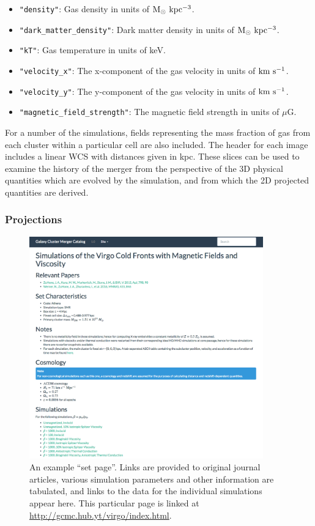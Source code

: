\documentclass{emulateapj}
\newcommand{\code}[1]{\texttt{#1}}
\begin{document}
\begin{itemize}
\item \code{"density"}: Gas density in units of $\rm{M_\odot~kpc^{-3}}$.
\item \code{"dark\_matter\_density"}: Dark matter density in units of $\rm{M_\odot~kpc^{-3}}$.
\item \code{"kT"}: Gas temperature in units of keV.
\item \code{"velocity\_x"}: The x-component of the gas velocity in units of $\rm{km~s^{-1}}$.
\item \code{"velocity\_y"}: The y-component of the gas velocity in units of $\rm{km~s^{-1}}$.
\item \code{"magnetic\_field\_strength"}: The magnetic field strength in units of $\mu$G.
\end{itemize}

For a number of the simulations, fields representing the mass fraction of gas from each cluster within a particular cell are also included. The header for each image includes a linear WCS with distances given in kpc. These slices can be used to examine the history of the merger from the perspective of the 3D physical quantities which are evolved by the simulation, and from which the 2D projected quantities are derived.

\subsubsection{Projections}\label{sec:projections}

\begin{figure}
\begin{center}
\includegraphics[width=0.9\textwidth]{set_page.eps}
\caption{An example ``set page''. Links are provided to original journal articles, various simulation parameters and other information are tabulated, and links to the data for the individual simulations appear here. This particular page is linked at \url{http://gcmc.hub.yt/virgo/index.html}.}
\end{center}
\end{figure}
\end{document}
